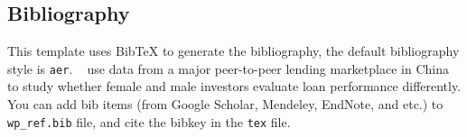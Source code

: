 \documentclass{elegantpaper}
\begin{document}
\subsection{Bibliography}
This template uses Bib\TeX{} to generate the bibliography, the default bibliography style is \verb|aer|. ~\cite{Chen2018} use data from a major peer-to-peer lending marketplace in China to study whether female and male investors evaluate loan performance differently. You can add bib items (from Google Scholar, Mendeley, EndNote, and etc.) to \verb|wp_ref.bib| file, and cite the bibkey in the \verb|tex| file.


\nocite{EINAV2010,Havrylchyk2018} 



\end{document}
